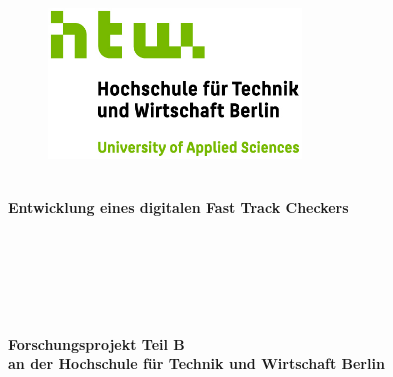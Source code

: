  \thispagestyle{empty}
\begin{titlepage}
	 \thispagestyle{empty}
\begin{center}
	 \thispagestyle{empty}
\begin{figure}[t]
	\centering
	\includegraphics[width=0.6\textwidth]{assets/HTW_Logo.jpg}
	
\end{figure}

$~~$\\
\textbf{\huge Entwicklung eines digitalen Fast Track Checkers }\paragraph{}$~~$\\
\paragraph{}$~~$\\
\paragraph{}$~~$\\
\textbf{Forschungsprojekt Teil B}\\ \textbf{an der Hochschule für Technik und Wirtschaft Berlin}
\paragraph{}$~~$\\
\paragraph{}$~~$\\

\end{center}
\end{titlepage}
